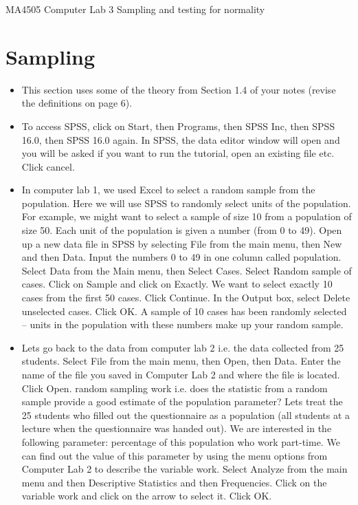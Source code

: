  
 
 
 
 
 
 
 
 
 
 
MA4505   Computer Lab 3 Sampling and testing for normality
 
\section{Sampling}

\begin{itemize} 
\item This section uses some of the theory from Section 1.4 of your notes (revise the definitions on page 6).
\item To access SPSS, click on Start, then Programs, then SPSS Inc, then SPSS 16.0, then SPSS 16.0 again. In SPSS, the data editor window will open and you will be asked if you want to run the tutorial, open an existing file etc. Click cancel.
\item In computer lab 1, we used Excel to select a random sample from the population. Here we will use SPSS to randomly select units of the population. For example, we might want to select a sample of size 10 from a population of size 50. Each unit of the population is given a number (from 0 to 49). Open up a new data file in SPSS by selecting File from the main menu, then New and then Data. Input the numbers 0 to 49 in one column called population. Select Data from the Main menu, then Select Cases. Select Random sample of cases. Click on Sample and click on Exactly. We want to select exactly 10 cases from the first 50 cases. Click Continue. In the Output box, select Delete unselected cases. Click OK. A sample of 10 cases has been randomly selected – units in the population with these numbers make up your random sample.
\item Lets go back to the data from computer lab 2 i.e. the data collected from 25 students. Select File from the main menu, then Open, then Data. Enter the name of the file you saved in Computer Lab 2 and where the file is located. Click Open.
\itemDoes random sampling work i.e. does the statistic from a random sample provide a good estimate of the population parameter? Lets treat the 25 students who filled out the questionnaire as a population (all students at a lecture when the questionnaire was handed out). We are interested in the following parameter: percentage of this population who work part-time. We can find out the value of this parameter by using the menu options from Computer Lab 2 to describe the variable work. Select Analyze from the main menu and then Descriptive Statistics and then Frequencies. Click on the variable work and click on the arrow to select it. Click OK.
\end{itemize}
 
